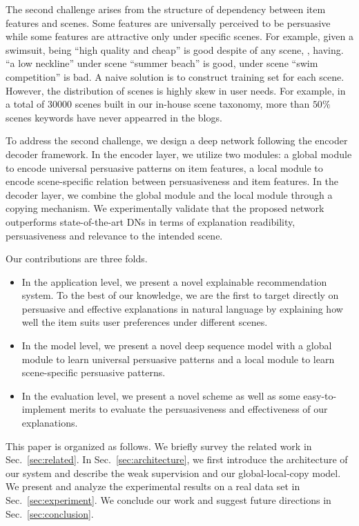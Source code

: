 \documentclass[sigconf]{acmart}
\begin{document}
The second challenge arises from the structure of dependency between item features and scenes. Some features are universally perceived to be persuasive while some features are attractive only under specific scenes. For example, given a swimsuit, being ``high quality and cheap'' is good despite of any scene, , having. ``a low neckline'' under scene ``summer beach'' is good, under scene ``swim competition'' is bad. 
A naive solution is to construct training set for each scene.
However, the distribution of scenes is highly skew in user needs. For example, in a total of $30000$ scenes built in our in-house scene taxonomy, more than $50\%$ scenes keywords have never appearred in the blogs. %


To address the second challenge, we design a deep network following the encoder decoder framework. In the encoder layer, we utilize two modules: a global module to encode universal persuasive patterns on item features, a local module to encode scene-specific relation between persuasiveness and item features. In the decoder layer, we combine the global module and the local module through a copying mechanism. We experimentally validate that the proposed network outperforms state-of-the-art DNs in terms of explanation readibility, persuasiveness and relevance to the intended scene. 

Our contributions are three folds.
\begin{itemize}
\item In the application level, we present a novel explainable recommendation system. To the best of our knowledge, we are the first to target directly on persuasive and effective explanations in natural language by explaining how well the item suits user preferences under different scenes.
\item In the model level, we present a novel deep sequence model with a global module to learn universal persuasive patterns and a local module to learn scene-specific persuasive patterns.
\item In the evaluation level, we present a novel scheme as well as some easy-to-implement merits to evaluate the persuasiveness and effectiveness of our explanations. 
\end{itemize}


This paper is organized as follows. We briefly survey the related work in Sec.~\ref{sec:related}. In Sec.~\ref{sec:architecture}, we first introduce the architecture of our system and describe the weak supervision and our global-local-copy model. We present and analyze the experimental results on a real data set in Sec.~\ref{sec:experiment}. We conclude our work and suggest future directions in Sec.~\ref{sec:conclusion}.
\end{document}
